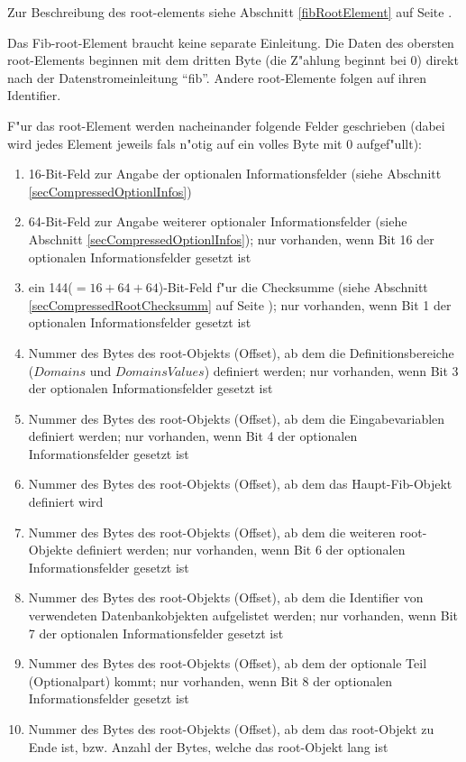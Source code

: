 Zur Beschreibung des root-elements siehe Abschnitt \ref{fibRootElement} auf Seite \pageref{fibRootElement} .

Das Fib-root-Element braucht keine separate Einleitung. Die Daten des obersten root-Elements beginnen mit dem dritten Byte (die Z"ahlung beginnt bei 0) direkt nach der Datenstromeinleitung ``fib''. Andere root-Elemente folgen auf ihren Identifier.

\bigskip\noindent
F"ur das root-Element werden nacheinander folgende Felder geschrieben (dabei wird jedes Element jeweils fals n"otig auf ein volles Byte mit $0$ aufgef"ullt):
\begin{enumerate}
 \item 16-Bit-Feld zur Angabe der optionalen Informationsfelder (siehe Abschnitt \ref{secCompressedOptionlInfos})
 \item 64-Bit-Feld zur Angabe weiterer optionaler Informationsfelder (siehe Abschnitt \ref{secCompressedOptionlInfos}); nur vorhanden, wenn Bit 16 der optionalen Informationsfelder gesetzt ist
 \item ein 144($=16+64+64$)-Bit-Feld f"ur die Checksumme (siehe Abschnitt \ref{secCompressedRootChecksumm} auf Seite \pageref{secCompressedRootChecksumm} ); nur vorhanden, wenn Bit 1 der optionalen Informationsfelder gesetzt ist
 \item Nummer des Bytes des root-Objekts (Offset), ab dem die Definitionsbereiche ($Domains$ und $DomainsValues$) definiert werden; nur vorhanden, wenn Bit 3 der optionalen Informationsfelder gesetzt ist
 \item Nummer des Bytes des root-Objekts (Offset), ab dem die Eingabevariablen definiert werden; nur vorhanden, wenn Bit 4 der optionalen Informationsfelder gesetzt ist
 \item Nummer des Bytes des root-Objekts (Offset), ab dem das Haupt-Fib-Objekt definiert wird
 \item Nummer des Bytes des root-Objekts (Offset), ab dem die weiteren root-Objekte definiert werden; nur vorhanden, wenn Bit 6 der optionalen Informationsfelder gesetzt ist
 \item Nummer des Bytes des root-Objekts (Offset), ab dem die Identifier von verwendeten Datenbankobjekten aufgelistet werden; nur vorhanden, wenn Bit 7 der optionalen Informationsfelder gesetzt ist
 \item Nummer des Bytes des root-Objekts (Offset), ab dem der optionale Teil (Optionalpart) kommt; nur vorhanden, wenn Bit 8 der optionalen Informationsfelder gesetzt ist
 \item Nummer des Bytes des root-Objekts (Offset), ab dem das root-Objekt zu Ende ist, bzw. Anzahl der Bytes, welche das root-Objekt lang ist

\end{enumerate}
